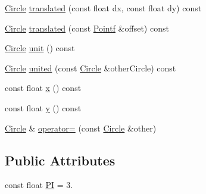 \begin{DoxyCompactItemize}
\item 
\hyperlink{classprism_1_1_circle}{Circle} \hyperlink{classprism_1_1_circle_a255dcfc157fc52c83e0cbd9e54a65b89}{translated} (const float dx, const float dy) const 
\item 
\hyperlink{classprism_1_1_circle}{Circle} \hyperlink{classprism_1_1_circle_a7592ecc319feeaa2b446505b975b97c5}{translated} (const \hyperlink{classprism_1_1_pointf}{Pointf} \&offset) const 
\item 
\hyperlink{classprism_1_1_circle}{Circle} \hyperlink{classprism_1_1_circle_a9b5c163bfdb6d39fb890fa3a21a77a20}{unit} () const 
\item 
\hyperlink{classprism_1_1_circle}{Circle} \hyperlink{classprism_1_1_circle_a8e34ff5188e91cfe080264e106909f6e}{united} (const \hyperlink{classprism_1_1_circle}{Circle} \&other\+Circle) const 
\item 
const float \hyperlink{classprism_1_1_circle_ae1f729f8fa34605123628e67b230b6be}{x} () const 
\item 
const float \hyperlink{classprism_1_1_circle_a6edc045d912b0d278bd0673af028290e}{y} () const 
\item 
\hyperlink{classprism_1_1_circle}{Circle} \& \hyperlink{classprism_1_1_circle_a5d06dde86a136d7ddda2b5db211e4392}{operator=} (const \hyperlink{classprism_1_1_circle}{Circle} \&other)
\end{DoxyCompactItemize}
\subsection*{Public Attributes}
\begin{DoxyCompactItemize}
\item 
const float \hyperlink{classprism_1_1_circle_a271b9a742c518b86b678cb4cd5b8f22c}{PI} = 3.
\end{DoxyCompactItemize}
